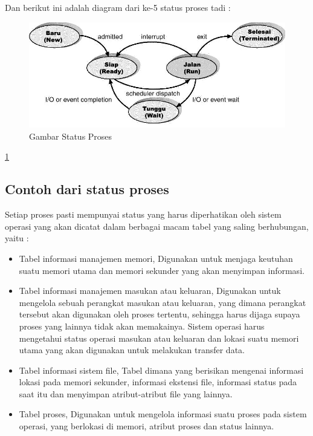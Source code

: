 	Dan berikut ini adalah diagram dari ke-5 status proses tadi :
	
	\begin{figure} [ht]
	\centerline{\includegraphics[width=1\textwidth]{figures/statusproses.jpg}}
	\caption{Gambar Status Proses}
	\label{statusproses}
	\end{figure}
	
	\ref{statusproses}
	
	\subsection{Contoh dari status proses}
	Setiap proses pasti mempunyai status yang harus diperhatikan oleh sistem operasi yang akan dicatat dalam berbagai macam tabel yang saling berhubungan, yaitu :
		\begin{itemize}
			\item Tabel informasi manajemen memori, Digunakan untuk menjaga keutuhan suatu memori utama dan memori sekunder yang akan menyimpan informasi.
			\item Tabel informasi manajemen masukan atau keluaran, Digunakan untuk mengelola sebuah perangkat masukan atau keluaran, yang dimana perangkat tersebut akan digunakan oleh proses tertentu, sehingga harus dijaga supaya proses yang lainnya tidak akan memakainya. Sistem operasi harus mengetahui status operasi masukan atau keluaran dan lokasi suatu memori utama yang akan digunakan untuk melakukan transfer data.
			\item Tabel informasi sistem file, Tabel dimana yang berisikan mengenai informasi lokasi pada memori sekunder, informasi ekstensi file, informasi status pada saat itu dan menyimpan atribut-atribut file yang lainnya.
			\item Tabel proses, Digunakan untuk mengelola informasi suatu proses pada sistem operasi, yang berlokasi di memori, atribut proses dan status lainnya.
		\end{itemize}
	
